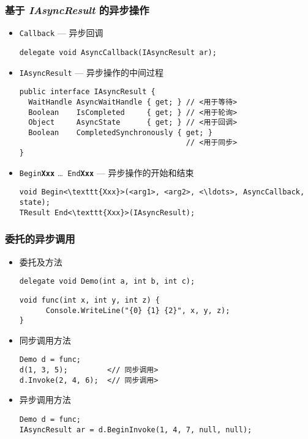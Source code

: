 \begin{frame}[fragile]
\frametitle{基于 \textit{IAsyncResult} 的异步操作}

\begin{itemize}
\item \texttt{Callback} --- 异步回调
\begin{lstlisting}
delegate void AsyncCallback(IAsyncResult ar);
\end{lstlisting}
\item \texttt{IAsyncResult} --- 异步操作的中间过程
\begin{lstlisting}[escapeinside=<>]
public interface IAsyncResult {
  WaitHandle AsyncWaitHandle { get; } // <用于等待>
  Boolean    IsCompleted     { get; } // <用于轮询>
  Object     AsyncState      { get; } // <用于回调>
  Boolean    CompletedSynchronously { get; }
                                      // <用于同步>
}
\end{lstlisting}
\item \texttt{Begin\textbf{Xxx}} \ldots\ \texttt{End\textbf{Xxx}} --- 异步操作的开始和结束
\begin{lstlisting}[escapeinside=<>]
void Begin<\texttt{Xxx}>(<arg1>, <arg2>, <\ldots>, AsyncCallback, state);
TResult End<\texttt{Xxx}>(IAsyncResult);
\end{lstlisting}
\end{itemize}
\end{frame}


\begin{frame}[fragile]
\frametitle{委托的异步调用}

\begin{itemize}
\item 委托及方法
\begin{lstlisting}
delegate void Demo(int a, int b, int c);
\end{lstlisting}
\begin{lstlisting}
void func(int x, int y, int z) {
      Console.WriteLine("{0} {1} {2}", x, y, z);
}
\end{lstlisting}
\item 同步调用方法
\begin{lstlisting}[escapeinside=<>]
Demo d = func;
d(1, 3, 5);         <// 同步调用>
d.Invoke(2, 4, 6);  <// 同步调用>
\end{lstlisting}
\item 异步调用方法
\begin{lstlisting}[escapeinside=<>]
Demo d = func;
IAsyncResult ar = d.BeginInvoke(1, 4, 7, null, null);
\end{lstlisting}
\end{itemize}
\end{frame}


